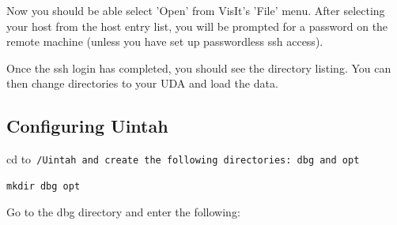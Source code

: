 \documentclass[12pt]{report}
\begin{document}
Now you should be able select 'Open' from VisIt's 'File' menu. After selecting your host from the host entry list, you will be prompted for a password on the remote machine (unless you have set up passwordless ssh access). 

Once the ssh login has completed, you should see the directory listing. You can then change directories to your UDA and load the data. 















\subsection{Configuring Uintah}

cd to\tt ~/Uintah \normalfont and create the following directories:
dbg and opt

\begin{verbatim}
mkdir dbg opt
\end{verbatim}

Go to the dbg directory and enter the following:
\end{document}
